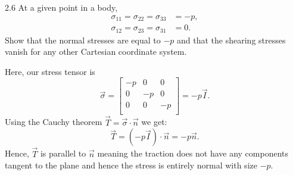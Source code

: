 \begin{problem}{2.6}
  At a given point in a body,
  \begin{align*}
    \sigma_{11} = \sigma_{22} = \sigma_{33} &= -p, \\
    \sigma_{12} = \sigma_{23} = \sigma_{31} &= 0
  .\end{align*}
  Show that the normal stresses are equal to $-p$ and that the shearing stresses vanish for any other Cartesian coordinate system.
\end{problem}

\begin{derivation}
  Here, our stress tensor is
  \begin{equation*}
    \Vec{\sigma} = \begin{bmatrix}
      -p & 0 & 0\\
    0 & -p & 0\\
    0 & 0 & -p\\
    \end{bmatrix} = -p \Vec{I}
  .\end{equation*}
  Using the Cauchy theorem $\Vec{T} = \Vec{\sigma} \cdot \Vec{n}$ we get:
  \begin{equation*}
    \Vec{T} = (-p \Vec{I}) \cdot \Vec{n} = -p \Vec{n}
  .\end{equation*}
  Hence, $\Vec{T}$ is parallel to $\Vec{n}$ meaning the traction does not have any components tangent to the plane and hence the stress is entirely normal with size $-p$.
\end{derivation}
